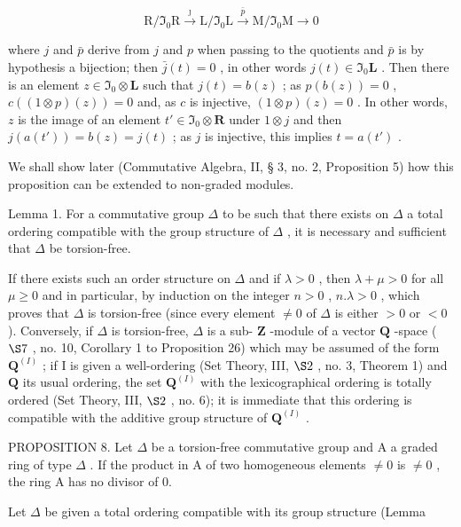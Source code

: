 \[
\mathrm{R} / \mathfrak {I} _ {0} \mathrm{R} \xrightarrow {\jmath} \mathrm{L} / \mathfrak {I} _ {0} \mathrm{L} \xrightarrow {\bar {p}} \mathrm{M} / \mathfrak {I} _ {0} \mathrm{M} \longrightarrow 0
\]

where \(j\) and \(\bar{p}\) derive from \(j\) and \(p\) when passing to the quotients and \(\bar{p}\) is by hypothesis a bijection; then \(\bar{j}(t) = 0\) , in other words \(j(t) \in \mathfrak{I}_0\mathbf{L}\) . Then there is an element \(z \in \mathfrak{I}_0 \otimes \mathbf{L}\) such that \(j(t) = b(z)\) ; as \(p(b(z)) = 0\) , \(c((1 \otimes p)(z)) = 0\) and, as \(c\) is injective, \((1 \otimes p)(z) = 0\) . In other words, \(z\) is the image of an element \(t' \in \mathfrak{I}_0 \otimes \mathbf{R}\) under \(1 \otimes j\) and then \(j(a(t')) = b(z) = j(t)\) ; as \(j\) is injective, this implies \(t = a(t')\) .

We shall show later (Commutative Algebra, II, § 3, no. 2, Proposition 5) how this proposition can be extended to non-graded modules.

Lemma 1. For a commutative group \(\Delta\) to be such that there exists on \(\Delta\) a total ordering compatible with the group structure of \(\Delta\) , it is necessary and sufficient that \(\Delta\) be torsion-free.

If there exists such an order structure on \(\Delta\) and if \(\lambda > 0\) , then \(\lambda + \mu > 0\) for all \(\mu \geqslant 0\) and in particular, by induction on the integer \(n > 0\) , \(n.\lambda > 0\) , which proves that \(\Delta\) is torsion-free (since every element \(\neq 0\) of \(\Delta\) is either \(>0\) or \(< 0\) ). Conversely, if \(\Delta\) is torsion-free, \(\Delta\) is a sub- \(\mathbf{Z}\) -module of a vector \(\mathbf{Q}\) -space ( \(\S 7\) , no. 10, Corollary 1 to Proposition 26) which may be assumed of the form \(\mathbf{Q}^{(I)}\) ; if I is given a well-ordering (Set Theory, III, \(\S 2\) , no. 3, Theorem 1) and \(\mathbf{Q}\) its usual ordering, the set \(\mathbf{Q}^{(I)}\) with the lexicographical ordering is totally ordered (Set Theory, III, \(\S 2\) , no. 6); it is immediate that this ordering is compatible with the additive group structure of \(\mathbf{Q}^{(I)}\) .

PROPOSITION 8. Let \(\Delta\) be a torsion-free commutative group and A a graded ring of type \(\Delta\) . If the product in A of two homogeneous elements \(\neq 0\) is \(\neq 0\) , the ring A has no divisor of 0.

Let \(\Delta\) be given a total ordering compatible with its group structure (Lemma

